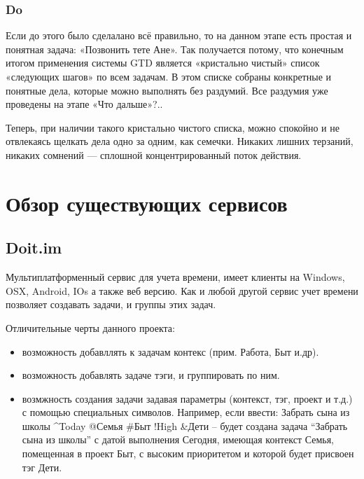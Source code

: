 \subsubsection{Do }

Если до этого было сделалано всё правильно, то на данном этапе есть простая и понятная задача: «Позвонить тете Ане».
Так получается потому, что конечным итогом применения системы GTD является «кристально чистый» список «следующих шагов» по всем задачам. В этом списке собраны конкретные и понятные дела, которые можно выполнять без раздумий. Все раздумия уже проведены на этапе «Что дальше»?..

Теперь, при наличии такого кристально чистого списка, можно спокойно и не отвлекаясь щелкать дела одно за одним, как семечки. Никаких лишних терзаний, никаких сомнений — сплошной концентрированный поток действия. 

\section{Обзор существующих сервисов} 
\label{sec:practice:analogs}

\subsection{Doit.im}
\label{sub:practice:analogs:doit}
Мультиплатформенный  сервис для учета времени, имеет клиенты на Windows, OSX, Android, IOs а также веб версию. Как и любой другой сервис учет времени позволяет создавать задачи, и группы этих задач.

Отличительные черты данного проекта:

\begin{itemize}
  \item возможность добавллять к задачам контекс (прим. Работа, Быт и.др).
  \item возможность добавлять задаче тэги, и группировать по ним.
  \item возмжность создания задачи задавая параметры (контекст, тэг, проект и т.д.) с помощью специальных символов. Например, если ввести: Забрать сына из школы \string^Today @Семья \#Быт !High \&Дети –  будет создана задача “Забрать сына из школы” с датой выполнения Сегодня, имеющая контекст Семья, помещенная в проект Быт, с высоким приоритетом и которой будет присвоен тэг Дети.
\end{itemize}

